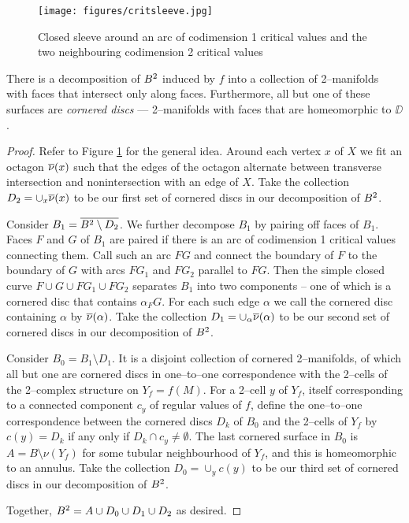 %




\begin{figure}
	\centering
	\captionsetup{justification=centering}
	\caption{Closed sleeve around an arc of codimension 1 critical values and the two neighbouring codimension 2 critical values}
	\texttt{[image: figures/critsleeve.jpg]}
	\label{fig:critsleeve}
\end{figure}

\begin{lem}
	\label{lem:bbdecomp}
	There is a decomposition of $B^2$ induced by $f$ into a collection of 2--manifolds with faces that intersect only along faces.
	Furthermore, all but one of these surfaces are \emph{cornered discs} --- 2--manifolds with faces that are homeomorphic to $\DD$.
\end{lem}

\begin{proof}
	Refer to Figure \ref{fig:critsleeve} for the general idea.	
	Around each vertex $x$ of $X$ we fit an octagon $\overline{\nu}(x)$ such that the edges of the octagon alternate between transverse intersection and nonintersection with an edge of $X$.
	Take the collection $D_2=\cup_x \overline{\nu}(x)$ to be our first set of cornered discs in our decomposition of $B^2$.
	
	Consider $B_1=\overline{B^2\setminus D_2}$.
	We further decompose $B_1$ by pairing off faces of $B_1$.
	Faces $F$ and $G$ of $B_1$ are paired if there is an arc of codimension 1 critical values connecting them.
	Call such an arc $FG$ and connect the boundary of $F$ to the boundary of $G$ with arcs $FG_1$ and $FG_2$ parallel to $FG$.
	Then the simple closed curve  $F\cup G \cup FG_1\cup FG_2$ separates $B_1$ into two components -- one of which is a cornered disc that contains $\alpha_FG$.
	For each such edge $\alpha$ we call the cornered disc containing $\alpha$ by $\overline{\nu}(\alpha)$.
	Take the collection $D_1=\cup_\alpha \overline{\nu}(\alpha)$ to be our second set of cornered discs in our decomposition of $B^2$.
	
	Consider $B_0=B_1\setminus D_1$.
	It is a disjoint collection of cornered 2--manifolds, of which all but one are cornered discs in one--to--one correspondence with the 2--cells of the 2--complex structure on $Y_f=f(M)$.
	For a 2--cell $y$ of $Y_f$, itself corresponding to a connected component $c_y$ of regular values of $f$, define the one--to--one correspondence between the cornered discs $D_k$ of $B_0$ and the 2--cells of $Y_f$ by $c(y)=D_k$ if any only if $D_k\cap c_y\neq\emptyset$.
	The last cornered surface in $B_0$ is $A=B\setminus\nu(Y_f)$ for some tubular neighbourhood of $Y_f$, and this is homeomorphic to an annulus.
	Take the collection $D_0=\cup_y c(y)$ to be our third set of cornered discs in our decomposition of $B^2$.
	
	Together, $B^2=A\cup D_0\cup D_1\cup D_2$ as desired.
\end{proof}

